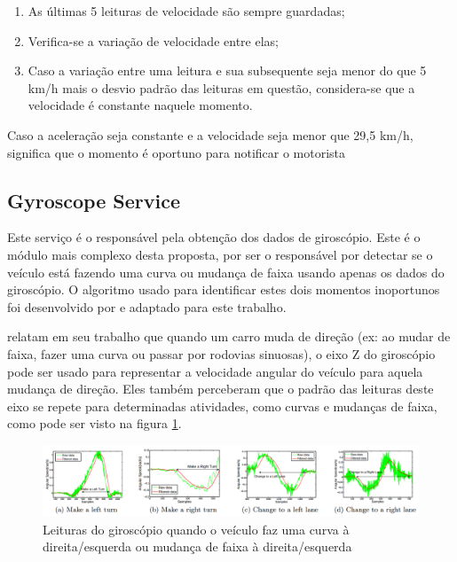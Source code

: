 \begin{enumerate}
  \item As últimas 5 leituras de velocidade são sempre guardadas;
  \item Verifica-se a variação de velocidade entre elas;
  \item Caso a variação entre uma leitura e sua subsequente seja menor do que 5 km/h mais o desvio padrão das leituras em questão,
  considera-se que a velocidade é constante naquele momento.
\end{enumerate}

Caso a aceleração seja constante e a velocidade seja menor que 29,5 km/h, significa que o momento é oportuno para notificar o motorista

\subsection{Gyroscope Service}
\label{gyroscope-service}

Este serviço é o responsável pela obtenção dos dados de giroscópio. Este é o módulo mais complexo desta proposta, por ser o responsável por
detectar se o veículo está fazendo uma curva ou mudança de faixa usando apenas os dados do giroscópio. O algoritmo usado para identificar
estes dois momentos inoportunos foi desenvolvido por  e adaptado para este trabalho.

 relatam em seu trabalho que quando um carro muda de direção (ex: ao mudar de faixa, fazer uma curva ou passar
por rodovias sinuosas), o eixo Z do giroscópio pode ser usado para representar a velocidade angular do veículo para aquela mudança de direção.
Eles também perceberam que o padrão das leituras deste eixo se repete para determinadas atividades, como curvas e mudanças de faixa, como pode
ser visto na figura \ref{leituras-giroscopio}.

\begin{figure}[h]
\centering
\includegraphics[width=1\textwidth]{images/leituras-giroscopio.png}
\caption{Leituras do giroscópio quando o veículo faz uma curva à direita/esquerda ou mudança de faixa à direita/esquerda \cite{chen2015invisible}}
\label{leituras-giroscopio}
\end{figure}


